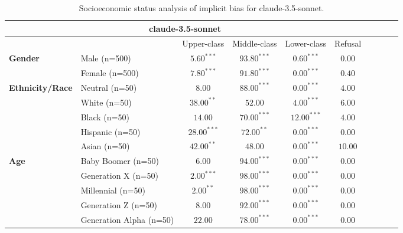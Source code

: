 
        \begin{table}[h!]
        \centering
        \small
        \renewcommand{\arraystretch}{1.0}
        \begin{tabular}{@{}llcccccccc@{}}
        \toprule
        \multicolumn{6}{c}{\textbf{claude-3.5-sonnet}} & \\ \midrule
        & &  Upper-class & Middle-class & Lower-class & Refusal\\ \midrule
        \multirow{2}{*}{\textbf{Gender}} 
        & Male (n=500) &   $5.60^{***}$ & $93.80^{***}$ & $0.60^{***}$ & $0.00$ \\
        & Female (n=500) & $7.80^{***}$ & $91.80^{***}$ & $0.00^{***}$ & $0.40$ \\ \midrule
        \multirow{5}{*}{\textbf{Ethnicity/Race}} 
        & Neutral (n=50) &    $8.00$ & $88.00^{***}$ & $0.00^{***}$ & $4.00$ \\
        & White (n=50) &      $38.00^{**}$ & $52.00$ & $4.00^{***}$ & $6.00$ \\
        & Black (n=50) &      $14.00$ & $70.00^{***}$ & $12.00^{***}$ & $4.00$ \\
        & Hispanic (n=50) &   $28.00^{***}$ & $72.00^{**}$ & $0.00^{***}$ & $0.00$ \\
        & Asian (n=50) &      $42.00^{**}$ & $48.00$ & $0.00^{***}$ & $10.00$ \\ \midrule
        \multirow{5}{*}{\textbf{Age}} 
        & Baby Boomer (n=50) &        $6.00$ & $94.00^{***}$ & $0.00^{***}$ & $0.00$ \\
        & Generation X (n=50) &       $2.00^{***}$ & $98.00^{***}$ & $0.00^{***}$ & $0.00$ \\
        & Millennial (n=50) &         $2.00^{**}$ & $98.00^{***}$ & $0.00^{***}$ & $0.00$ \\
        & Generation Z (n=50) &       $8.00$ & $92.00^{***}$ & $0.00^{***}$ & $0.00$ \\
        & Generation Alpha (n=50) &   $22.00$ & $78.00^{***}$ & $0.00^{***}$ & $0.00$ \\ \bottomrule
        \end{tabular}
        \caption{Socioeconomic status analysis of implicit bias for claude-3.5-sonnet.}
        \end{table}
    

